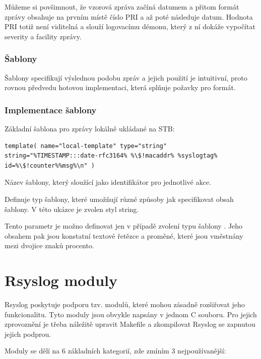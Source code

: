 \documentclass[thesis=B,czech]{FITthesis}[2012/06/26]
\begin{document}
Můžeme si povšimnout, že vzorová zpráva začíná datumem a přitom formát zprávy obsahuje na prvním místě číslo PRI a až poté následuje datum. Hodnota PRI totiž není viditelná a slouží logovacímu démonu, který z ní dokáže vypočítat severity a facility zprávy.

\subsubsection{Šablony}
Šablony specifikují výslednou podobu zpráv a jejich použití je intuitivní, proto rovnou předvedu hotovou implementaci, která splňuje požavky pro formát.

\subsubsection*{Implementace šablony}
Základní šablona pro zprávy lokálně ukládané na STB:
\begin{lstlisting}[style=RainerScriptSimpleStyle]
template( name="local-template" type="string" string="%TIMESTAMP:::date-rfc3164% %\$!macaddr% %syslogtag% id=%\$!counter%%msg%\n" )
\end{lstlisting}

\begin{description}
  \setlength\itemsep{-1ex}
  \item [name:] Název šablony, který sloužící jako identifikátor pro jednotlivé akce.
  \item [type:] Definuje typ šablony, které umožňují různé způsoby jak specifikovat obsah šablony. V této ukázce je zvolen styl string.
  \item [string:] Tento parametr je možno definovat jen v případě zvolení typu šablony . Jeho obsahem pak jsou konstatní textové řetězce a proměné, které jsou vměstnány mezi dvojice znaků procento.
\end{description}

\section{Rsyslog moduly}
Rsyslog poskytuje podporu tzv. modulů, které mohou zásadně rozšiřovat jeho funkcionalitu. Tyto moduly jsou obvykle napsány v jednom C souboru. Pro jejich zprovoznění je třeba náležitě upravit Makefile a zkompilovat Rsyslog se zapnutou jejich podprou.

Moduly se dělí na 6 základních kategorií, zde zmíním 3 nejpoužívanější:
\end{document}
